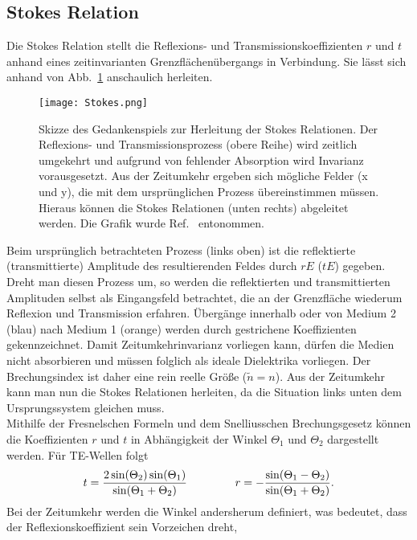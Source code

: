 \subsection{\label{subsec:FZV4}Stokes Relation}
Die Stokes Relation stellt die Reflexions- und Transmissionskoeffizienten $r$ und $t$ anhand
eines zeitinvarianten Grenzflächenübergangs in Verbindung. Sie lässt sich anhand von Abb.~\ref{fig:stokes}
anschaulich herleiten.
\begin{figure}[h!]
  \centering
  \texttt{[image: Stokes.png]}
  \caption{\label{fig:stokes}Skizze des Gedankenspiels zur Herleitung der Stokes Relationen.
    Der Reflexions- und Transmissionsprozess (obere Reihe) wird zeitlich umgekehrt und aufgrund von
    fehlender Absorption wird Invarianz vorausgesetzt. Aus der Zeitumkehr ergeben sich mögliche
    Felder (x und y), die mit dem ursprünglichen Prozess übereinstimmen müssen. Hieraus können die
    Stokes Relationen (unten rechts) abgeleitet werden. Die Grafik wurde Ref.~\cite{Stokes} entonommen.}
\end{figure}\FloatBarrier
Beim ursprünglich betrachteten Prozess (links oben) ist die reflektierte (transmittierte) Amplitude
des resultierenden Feldes durch $rE$ ($tE$) gegeben. Dreht man diesen Prozess um, so werden die
reflektierten und transmittierten Amplituden selbst als Eingangsfeld betrachtet, die an der
Grenzfläche wiederum Reflexion und Transmission erfahren. Übergänge innerhalb oder von Medium 2 (blau)
nach Medium 1 (orange) werden durch gestrichene Koeffizienten gekennzeichnet. Damit Zeitumkehrinvarianz
vorliegen kann, dürfen die Medien nicht absorbieren und müssen folglich als ideale Dielektrika vorliegen.
Der Brechungsindex ist daher eine rein reelle Größe ($\tilde{n} = n$).
Aus der Zeitumkehr kann man nun die Stokes Relationen herleiten, da die Situation links unten dem Ursprungssystem gleichen muss. \\
Mithilfe der Fresnelschen Formeln und dem Snelliusschen Brechungsgesetz können die Koeffizienten $r$ und $t$ in Abhängigkeit
der Winkel $\Theta_{1}$ und $\Theta_{2}$ dargestellt werden. Für TE-Wellen folgt
\begin{equation}
  t = \frac{2\sin(\Theta_{2})\sin(\Theta_{1})}{\sin(\Theta_{1} + \Theta_{2})}
  \hspace{1.5cm}
  r = -\frac{\sin(\Theta_{1} - \Theta_{2})}{\sin(\Theta_{1} + \Theta_{2})}.
\end{equation}
Bei der Zeitumkehr werden die Winkel andersherum definiert, was bedeutet, dass der Reflexionskoeffizient sein Vorzeichen dreht,
